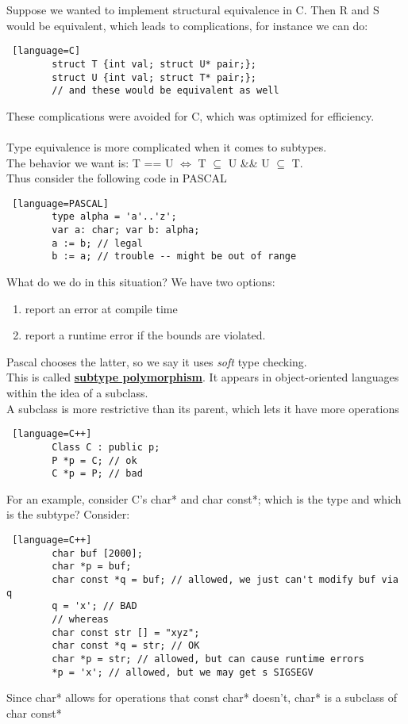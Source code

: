 \documentclass[../../lecture_notes.tex]{subfiles}
\begin{document}
\noindent Suppose we wanted to implement structural equivalence in C.		
Then R and S would be equivalent, which leads to complications, for instance we can do:
\begin{lstlisting} [language=C]
		struct T {int val; struct U* pair;};
		struct U {int val; struct T* pair;};
		// and these would be equivalent as well
\end{lstlisting}
These complications were avoided for C, which was optimized for efficiency.\\
\\
Type equivalence is more complicated when it comes to subtypes.\\
The behavior we want is: T == U $\iff$ T $\subseteq$ U \&\& U $\subseteq$ T.\\
Thus consider the following code in PASCAL
\begin{lstlisting} [language=PASCAL]
		type alpha = 'a'..'z';
		var a: char; var b: alpha;
		a := b; // legal
		b := a; // trouble -- might be out of range
\end{lstlisting}
What do we do in this situation?  We have two options:
\begin{enumerate} [itemsep=0mm]
	\item report an error at compile time
	\item report a runtime error if the bounds are violated.
\end{enumerate}
Pascal chooses the latter, so we say it uses \textit{soft} type checking.\\
This is called \textbf{\underline{subtype polymorphism}}.
It appears in object-oriented languages within the idea of a subclass.\\
A subclass is more restrictive than its parent, which lets it have more operations
\begin{lstlisting} [language=C++]
		Class C : public p;
		P *p = C; // ok
		C *p = P; // bad
\end{lstlisting}
For an example, consider C's char* and char const*; which is the type and which is the subtype? Consider:
\begin{lstlisting} [language=C++]
		char buf [2000];
		char *p = buf;
		char const *q = buf; // allowed, we just can't modify buf via q
		q = 'x'; // BAD
		// whereas
		char const str [] = "xyz";
		char const *q = str; // OK
		char *p = str; // allowed, but can cause runtime errors
		*p = 'x'; // allowed, but we may get s SIGSEGV
\end{lstlisting}
Since char* allows for operations that const char* doesn't, char* is a subclass of char const*\\
\end{document}

